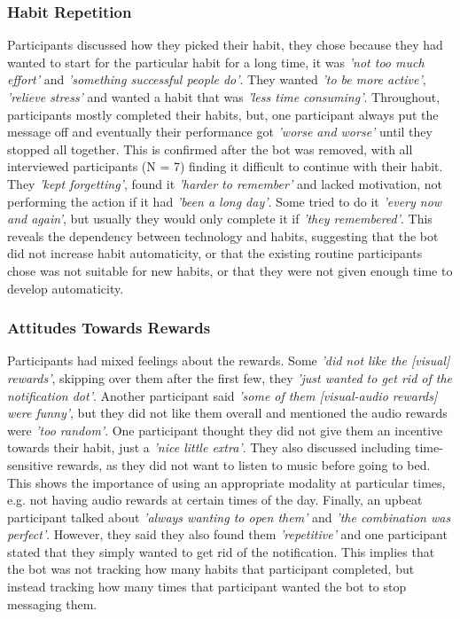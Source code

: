 \documentclass{scaffold/sigchi}
\begin{document}
\subsubsection{Habit Repetition}
Participants discussed how they picked their habit, they chose because they had wanted to start for the particular habit for a long time, it was \textit{'not too much effort'} and \textit{'something successful people do'}. They wanted \textit{'to be more active'}, \textit{'relieve stress'} and wanted a habit that was \textit{'less time consuming'}. Throughout, participants mostly completed their habits, but, one participant always put the message off and eventually their performance got \textit{'worse and worse'} until they stopped all together. This is confirmed after the bot was removed, with all interviewed participants (N = 7) finding it difficult to continue with their habit. They \textit{'kept forgetting'}, found it \textit{'harder to remember'} and lacked motivation, not performing the action if it had \textit{'been a long day'}. Some tried to do it \textit{'every now and again'}, but usually they would only complete it if \textit{'they remembered'}. This reveals the dependency between technology and habits, suggesting that the bot did not increase habit automaticity, or that the existing routine participants chose was not suitable for new habits, or that they were not given enough time to develop automaticity.

\subsubsection{Attitudes Towards Rewards}
Participants had mixed feelings about the rewards. Some \textit{'did not like the [visual] rewards'}, skipping over them after the first few, they \textit{'just wanted to get rid of the notification dot'}. Another participant said \textit{'some of them [visual-audio rewards] were funny'}, but they did not like them overall and mentioned the audio rewards were \textit{'too random'}. One participant thought they did not give them an incentive towards their habit, just a \textit{'nice little extra'}. They also discussed including time-sensitive rewards, as they did not want to listen to music before going to bed. This shows the importance of using an appropriate modality at particular times, e.g. not having audio rewards at certain times of the day. Finally, an upbeat participant talked about \textit{'always wanting to open them'} and \textit{'the combination was perfect'}. However, they said they also found them \textit{'repetitive'} and one participant stated that they simply wanted to get rid of the notification. This implies that the bot was not tracking how many habits that participant completed, but instead tracking how many times that participant wanted the bot to stop messaging them.
\end{document}
